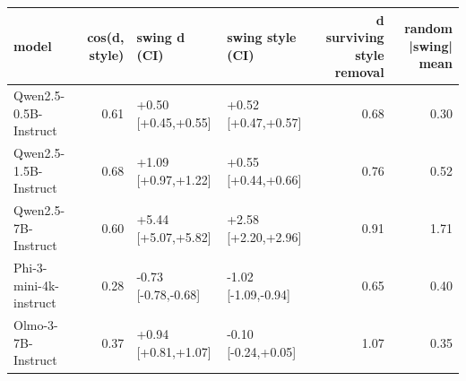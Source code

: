 \begin{tabular}{lrllrr}
\toprule
model & cos(d, style) & swing d (CI) & swing style (CI) & d surviving style removal & random |swing| mean \\
\midrule
Qwen2.5-0.5B-Instruct & 0.61 & +0.50 [+0.45,+0.55] & +0.52 [+0.47,+0.57] & 0.68 & 0.30 \\
Qwen2.5-1.5B-Instruct & 0.68 & +1.09 [+0.97,+1.22] & +0.55 [+0.44,+0.66] & 0.76 & 0.52 \\
Qwen2.5-7B-Instruct & 0.60 & +5.44 [+5.07,+5.82] & +2.58 [+2.20,+2.96] & 0.91 & 1.71 \\
Phi-3-mini-4k-instruct & 0.28 & -0.73 [-0.78,-0.68] & -1.02 [-1.09,-0.94] & 0.65 & 0.40 \\
Olmo-3-7B-Instruct & 0.37 & +0.94 [+0.81,+1.07] & -0.10 [-0.24,+0.05] & 1.07 & 0.35 \\
\bottomrule
\end{tabular}
